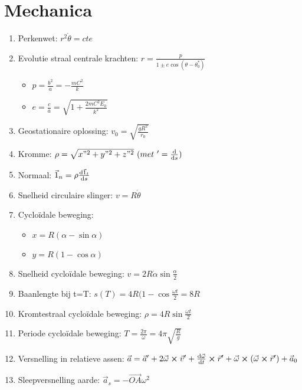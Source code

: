 \documentclass[12pt]{article}
\begin{document}
    \maketitle
	
    \section{Mechanica}
    \label{sec:mechanica}
    
    \begin{enumerate}
	    \item Perkenwet: $ r^2 \dot{\theta} = cte $
	    \item Evolutie straal centrale krachten: $ r = \frac{p}{1\pm e \cos{(\theta - \theta_0^{*} )}} $
		    \begin{itemize}
			    \item $ p = \frac{b^2}{a} = - \frac{mC^2}{k} $
			    \item  $ e = \frac{c}{a} = \sqrt{ 1 + \frac{2mC^2 E_0}{k^2} }$
		    \end{itemize}
    	    \item Geostationaire oplossing: $ v_0 = \sqrt{ \frac{gR^2}{r_0} }$
	    \item Kromme: $ \rho = \sqrt{x"^2 + y"^2 + z"^2 }\ (met\ '=\dv{}{s}) $
	    \item Normaal: $ \vec{1}_n = \rho \dv{\vec{1}_t}{s} $
	    \item Snelheid circulaire slinger: $ v = R \dot{\theta} $
	    \item Cyclo\"idale beweging: 
		    \begin{itemize}
			    \item $x = R{(\alpha - \sin{\alpha} )} $
			    \item $y = R{(1 - \cos{\alpha} )} $
		    \end{itemize}
	    \item Snelheid cyclo\"idale beweging: $ v = 2 R \dot{\alpha} \sin{\frac{\alpha}{2}} $
	    \item Baanlengte bij t=T:  $ s(T) = 4R(1-\cos{\frac{\omega t}{2}} = 8R$
	    \item Kromtestraal cyclo\"idale beweging:  $ \rho = 4R \sin{\frac{\omega t}{2}} $
	    \item Periode cyclo\"idale beweging:  $ T = \frac{2\pi}{\omega} = 4\pi \sqrt{\frac{R}{g}}$
	    \item Versnelling in relatieve assen:  $ \vec{a} = \vec{a}' + 2\vec{\omega} \cross \vec{v}' + \dv{\vec{\omega}}{t} \cross \vec{r}' + \vec{\omega} \cross {(\vec{\omega} \cross \vec{r}' )} + \vec{a}_0 $
	    \item Sleepversnelling aarde: $ \vec{a}_s = -\vec{OA} \omega^2 $
    \end{enumerate}
    
\end{document}
